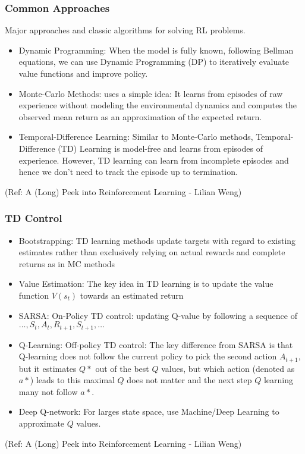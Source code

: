\begin{frame}[fragile]\frametitle{Common Approaches}

Major approaches and classic algorithms for solving RL
problems. 

\begin{itemize}
\item Dynamic Programming: When the model is fully known, following Bellman equations, we can use Dynamic Programming (DP)
to iteratively evaluate value functions and improve policy.
\item Monte-Carlo Methods:  uses a simple idea: It learns
from episodes of raw experience without modeling the environmental dynamics and computes the
observed mean return as an approximation of the expected return.
\item Temporal-Difference Learning: Similar to Monte-Carlo methods, Temporal-Difference (TD) Learning is model-free and learns from
episodes of experience. However, TD learning can learn from incomplete episodes and hence we
don't need to track the episode up to termination.

\end{itemize}


{\tiny (Ref: A (Long) Peek into Reinforcement Learning - Lilian Weng)}


\end{frame}

\begin{frame}[fragile]\frametitle{TD Control}

\begin{itemize}
\item Bootstrapping: TD learning methods update targets with regard to existing estimates rather than exclusively relying
on actual rewards and complete returns as in MC methods
\item Value Estimation: The key idea in TD learning is to update the value function $V(s_t)$ towards an estimated return
\item SARSA: On-Policy TD control:  updating Q-value by following a sequence of $\ldots , S_t,A_t,R_{t+1}, S_{t+1},\ldots$
\item Q-Learning: Off-policy TD control: The key difference from SARSA is that Q-learning does not follow the current policy to pick the
second action $A_{t+1}$, but it estimates $Q*$ out of the best $Q$ values, but which action (denoted as $a*$) leads to this maximal $Q$ does not matter  and the next step $Q$ learning many not follow $a*$.
\item Deep Q-network: For larges state space, use Machine/Deep Learning to approximate $Q$ values.
\end{itemize}




{\tiny (Ref: A (Long) Peek into Reinforcement Learning - Lilian Weng)}


\end{frame}


